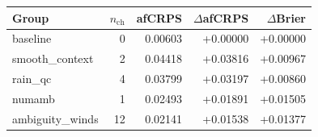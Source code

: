 \begin{tabular}{lrrrr}
\hline
Group & $n_{\mathrm{ch}}$ & afCRPS & $\Delta$afCRPS & $\Delta$Brier \\
\hline
baseline & 0 & 0.00603 & +0.00000 & +0.00000 \\
smooth_context & 2 & 0.04418 & +0.03816 & +0.00967 \\
rain_qc & 4 & 0.03799 & +0.03197 & +0.00860 \\
numamb & 1 & 0.02493 & +0.01891 & +0.01505 \\
ambiguity_winds & 12 & 0.02141 & +0.01538 & +0.01377 \\
\hline
\end{tabular}
